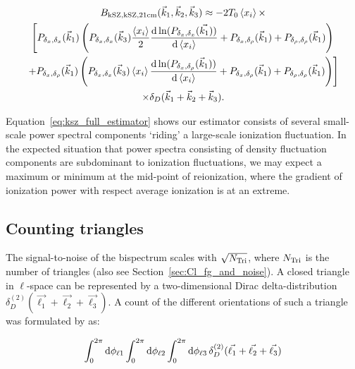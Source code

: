 \begin{multline}
B_{\rm kSZ, kSZ, {\rm 21cm}}(\vec{k}_1,\vec{k}_2,\vec{k}_3) \approx 
-2T_0\left\langle x_i \right\rangle \times \\
\left[
P_{\delta_x,\delta_x}(\vec{k}_1) \left( P_{\delta_x,\delta_x}(\vec{k}_3)\frac{\left\langle x_i \right\rangle}{2} \frac{{\rm d} \ln (P_{\delta_x,\delta_x}(\vec{k_1}))}{{\rm d}\left\langle x_i \right\rangle} + P_{\delta_x,\delta_{\rho}}(\vec{k}_1) + P_{\delta_{\rho},\delta_{\rho}}(\vec{k}_1) \right) \right. \\
\left.
+ P_{\delta_x,\delta_{\rho}}(\vec{k}_1) \left( P_{\delta_x,\delta_x}(\vec{k}_3)\left\langle x_i \right\rangle \frac{{\rm d} \ln (P_{\delta_x,\delta_{\rho}}(\vec{k}_1))}{{\rm d}\left\langle x_i \right\rangle} + P_{\delta_x,\delta_{\rho}}(\vec{k}_1) + P_{\delta_{\rho},\delta_{\rho}}(\vec{k}_1) \right)
\right] \\
\times \delta_D(\vec{k}_1+\vec{k}_2+\vec{k}_3).
\label{eq:ksz_full_estimator}
\end{multline}

Equation~\ref{eq:ksz_full_estimator} shows our estimator consists of several small-scale power spectral components `riding' a large-scale ionization fluctuation. In the expected situation that power spectra consisting of density fluctuation components are subdominant to ionization fluctuations, we may expect a maximum or minimum at the mid-point of reionization, where the gradient of ionization power with respect average ionization is at an extreme.

\subsection{Counting triangles}

The signal-to-noise of the bispectrum scales with $\sqrt{N_{\rm Tri}}$, where $N_{\rm Tri}$ is the number of triangles (also see Section~\ref{sec:Cl_fg_and_noise}).
A closed triangle in $\ell$-space can be represented by a two-dimensional Dirac delta-distribution $\delta^{(2)}_{D}(\vec{\ell_1}+\vec{\ell_2}+\vec{\ell_3})$. A count of the different orientations of such a triangle was formulated by \cite{Joachimi.09} as:

\begin{equation}
\int^{2\pi}_0 {\rm d}\phi_{\ell1} \int^{2\pi}_0 {\rm d}\phi_{\ell2} \int^{2\pi}_0 {\rm d}\phi_{\ell3} \,\delta^{(2)}_{D}(\vec{\ell_1}+\vec{\ell_2}+\vec{\ell_3})
\end{equation}

